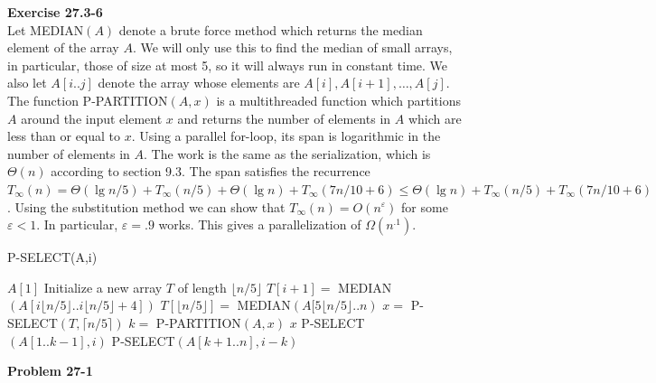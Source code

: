\documentclass{article}
\begin{document}
\noindent\textbf{Exercise 27.3-6}\\

Let MEDIAN$(A)$ denote a brute force method which returns the median element of the array $A$.  We will only use this to find the median of small arrays, in particular, those of size at most 5, so it will always run in constant time.  We also let $A[i..j]$ denote the array whose elements are $A[i], A[i+1], \ldots, A[j]$.  The function P-PARTITION$(A,x)$ is a multithreaded function which partitions $A$ around the input element $x$ and returns the number of elements in $A$ which are less than or equal to $x$. Using a parallel for-loop, its span is logarithmic in the number of elements in $A$.  The work is the same as the serialization, which is $\Theta(n)$ according to section 9.3.  The span satisfies the recurrence $T_\infty(n) = \Theta(\lg n/5) + T_\infty(n/5) + \Theta(\lg n) + T_\infty(7n/10 + 6) \leq \Theta(\lg n) + T_\infty(n/5) + T_\infty(7n/10 + 6)$.  Using the substitution method we can show that $T_\infty(n) = O(n^\varepsilon)$ for some $\varepsilon < 1$.  In particular, $\varepsilon = .9$ works.  This gives a parallelization of $\Omega(n^{.1})$.\\



\begin{algorithm}
\caption{P-SELECT(A,i)}
\begin{algorithmic}[1]
	\State \Return $A[1]$
\EndIf
\State Initialize a new array $T$ of length $\lfloor n/5 \rfloor$
	\State $T[i+1] = $ MEDIAN$(A[i\lfloor n/5 \rfloor..i\lfloor n/5 \rfloor + 4])$
\EndParFor
{}
	\State $T[\lfloor n/5 \rfloor] =$  MEDIAN$(A[5\lfloor n/5 \rfloor..n)$
\EndIf
\State $x = $ P-SELECT$(T, \lceil n/5 \rceil)$
\State $k = $ P-PARTITION$(A,x)$
	\State \Return $x$
	\State P-SELECT$(A[1..k-1],i)$
\Else
	\State P-SELECT$(A[k+1..n],i-k)$
\EndIf
\end{algorithmic}
\end{algorithm}

\noindent\textbf{Problem 27-1}\\
\end{document}
